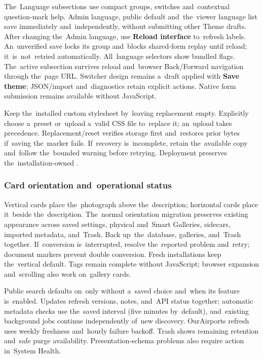 \documentclass[11pt,a4paper]{article}
\newcommand{\filepath}[1]{\path{#1}}
\newcommand{\ui}[1]{\textbf{#1}}
\begin{document}
The~Language subsections use compact groups, switches and~contextual
question-mark
help. Admin language, public default and~the~viewer language list save
immediately
and~independently, without submitting other Theme drafts. After changing
the~Admin
language, use \ui{Reload interface} to~refresh labels. An~unverified save locks
its
group and~blocks shared-form replay until reload; it~is~not~retried
automatically.
All~language selectors show bundled flags. The~active subsection survives reload
and~browser Back/Forward navigation through the~page URL. Switcher design
remains
a~draft applied with \ui{Save theme}; JSON/import and~diagnostics retain
explicit
actions. Native form submission remains available without JavaScript.

Keep the~installed custom stylesheet by~leaving replacement empty. Explicitly
choose a~preset or~upload a~valid CSS file to~replace it; an~upload takes
precedence. Replacement/reset verifies storage first and~restores prior bytes
if~saving the~marker fails. If~recovery is~incomplete, retain the~available copy
and~follow the~bounded warning before retrying. Deployment preserves
the~installation-owned \filepath{public/assets/custom.css}.

\subsubsection{Card orientation and~operational status}
Vertical cards place the~photograph above the~description; horizontal cards
place it~beside the~description. The~normal orientation migration preserves
existing appearance across saved settings, physical and~Smart Galleries,
sidecars, imported metadata, and~Trash. Back up~the~database, galleries,
and~Trash together. If~conversion is~interrupted, resolve the~reported problem
and~retry; document markers prevent double conversion. Fresh installations keep
the~vertical default. Tags remain complete without JavaScript; browser expansion
and~scrolling also work on~gallery cards.

Public search defaults on~only without a~saved choice and~when its feature
is~enabled. Updates refresh versions, notes, and~API status together; automatic
metadata checks use the~saved interval (five minutes by~default), and~existing
background jobs continue independently of~new discovery. OurAirports refresh
uses weekly freshness and~hourly failure backoff. Trash shows remaining
retention and~safe purge availability. Presentation-schema problems also require
action in~System Health.
\end{document}
